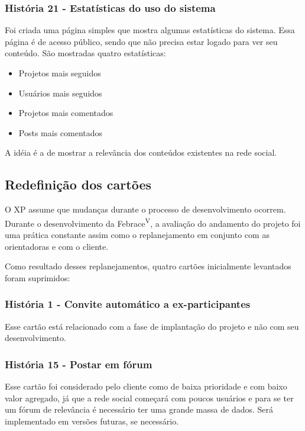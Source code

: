     \subsubsection{História 21 - Estatísticas do uso do sistema}

        Foi criada uma página simples que mostra algumas estatísticas do sistema. Essa página é de acesso público, sendo que não precisa estar logado para ver seu conteúdo. São mostradas quatro estatísticas:
	\begin{itemize}
	  \item{
		Projetos mais seguidos
	  }
	  \item{
		Usuários mais seguidos
	  }
	  \item{ 
	    Projetos mais comentados 
	  }
	  \item{ 
	    Posts mais comentados
	  }
	\end{itemize}

        A idéia é a de mostrar a relevância dos conteúdos existentes na rede social.

  \subsection{Redefinição dos cartões}

    O XP assume que mudanças durante o processo de desenvolvimento ocorrem. Durante o desenvolvimento da Febrace\textsuperscript{V}, a avaliação do andamento do projeto foi uma prática constante assim como o replanejamento em conjunto com as orientadoras e com o cliente. 

    Como resultado desses replanejamentos, quatro cartões inicialmente levantados foram suprimidos:

    \subsubsection{História 1 - Convite automático a ex-participantes}

      Esse cartão está relacionado com a fase de implantação do projeto e não com seu desenvolvimento. 

    \subsubsection{História 15 - Postar em fórum}

      Esse cartão foi considerado pelo cliente como de baixa prioridade e com baixo valor agregado, já que a rede social começará com poucos usuários e para se ter um fórum de relevância é necessário ter uma grande massa de dados. Será implementado em versões futuras, se necessário.

